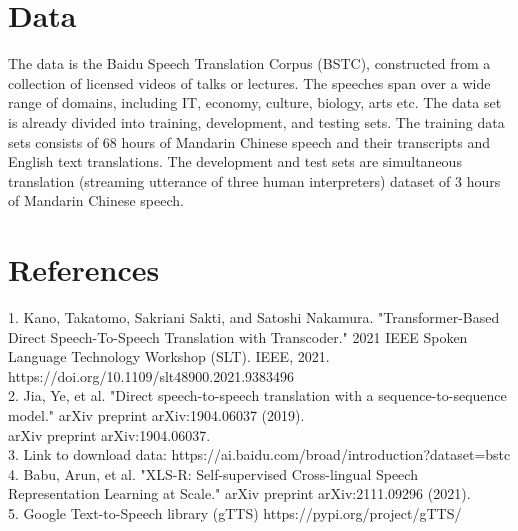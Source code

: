 \documentclass{article}
\begin{document}
\section{Data}
The data is the Baidu Speech Translation Corpus (BSTC), constructed from a collection of licensed videos of talks or lectures.  The speeches span over a wide range of domains, including IT, economy, culture, biology, arts etc. The data set is already divided into training, development, and testing sets. The training data sets consists of 68 hours of Mandarin Chinese speech and their transcripts and English text translations. The development and test sets are simultaneous translation (streaming utterance of three human interpreters) dataset of 3 hours of Mandarin Chinese speech.

\section{References}
1. Kano, Takatomo, Sakriani Sakti, and Satoshi Nakamura. "Transformer-Based Direct Speech-To-Speech Translation with Transcoder." 2021 IEEE Spoken Language Technology Workshop (SLT). IEEE, 2021.
https://doi.org/10.1109/slt48900.2021.9383496\\
2. Jia, Ye, et al. "Direct speech-to-speech translation with a sequence-to-sequence model." arXiv preprint arXiv:1904.06037 (2019).\\
arXiv preprint arXiv:1904.06037.\\
3. Link to download data:
https://ai.baidu.com/broad/introduction?dataset=bstc \\
4. Babu, Arun, et al. "XLS-R: Self-supervised Cross-lingual Speech Representation Learning at Scale." arXiv preprint arXiv:2111.09296 (2021).\\
5. Google Text-to-Speech library (gTTS) https://pypi.org/project/gTTS/
\end{document}

